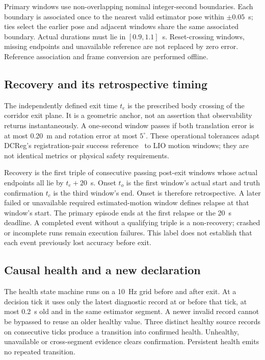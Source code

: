 \documentclass[conference]{IEEEtran}
\begin{document}
Primary windows use non-overlapping nominal integer-second boundaries.
Each boundary is associated once to the nearest valid estimator pose within
$\pm0.05$~s; ties select the earlier pose and adjacent windows share the same
associated boundary. Actual durations must lie in $[0.9,1.1]$~s. Reset-crossing
windows, missing endpoints and unavailable reference are not replaced by
zero error. Reference association and frame conversion are performed offline.

\subsection{Recovery and its retrospective timing}
The independently defined exit time $t_e$ is the prescribed body crossing of
the corridor exit plane. It is a geometric anchor, not an assertion that
observability returns instantaneously. A one-second window passes if both
translation error is at most 0.20~m and rotation error at most $5^\circ$.
These operational tolerances adapt DCReg's registration-pair success
reference~\cite{dcreg} to LIO motion windows; they are not identical metrics
or physical safety requirements.

Recovery is the first triple of consecutive passing post-exit windows whose
actual endpoints all lie by $t_e+20$~s. Onset $t_o$ is the first window's
actual start and truth confirmation $t_c$ is the third window's end.
Onset is therefore retrospective. A later failed or unavailable required
estimated-motion window defines relapse at that window's start. The primary
episode ends at the first relapse or the 20~s deadline. A completed event
without a qualifying triple is a non-recovery; crashed or incomplete runs
remain execution failures. This label does not establish that each event
previously lost accuracy before exit.

\subsection{Causal health and a new declaration}
The health state machine runs on a 10~Hz grid before and after exit. At a
decision tick it uses only the latest diagnostic record at or before that
tick, at most 0.2~s old and in the same estimator segment. A newer invalid
record cannot be bypassed to reuse an older healthy value. Three distinct
healthy source records on consecutive ticks produce a transition into
confirmed health. Unhealthy, unavailable or cross-segment evidence clears
confirmation. Persistent health emits no repeated transition.
\end{document}
